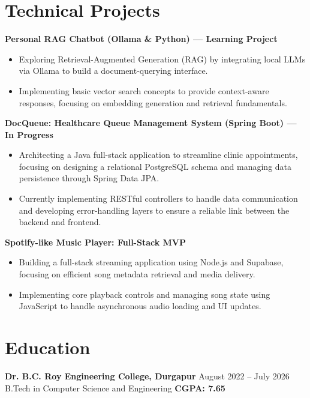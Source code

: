 \documentclass[a4paper,10.9pt]{article}
\begin{document}
\section{Technical Projects}
\textbf{Personal RAG Chatbot (Ollama \& Python) --- Learning Project}
\begin{itemize}[leftmargin=1.5em, itemsep=2pt, parsep=0pt, topsep=2pt]
    \item Exploring Retrieval-Augmented Generation (RAG) by integrating local LLMs via Ollama to build a document-querying interface.
    \item Implementing basic vector search concepts to provide context-aware responses, focusing on embedding generation and retrieval fundamentals.
\end{itemize}

\textbf{DocQueue: Healthcare Queue Management System (Spring Boot) --- In Progress}
\begin{itemize}[leftmargin=1.5em, itemsep=2pt, parsep=0pt, topsep=2pt]
    \item Architecting a Java full-stack application to streamline clinic appointments, focusing on designing a relational PostgreSQL schema and managing data persistence through Spring Data JPA.
    \item Currently implementing RESTful controllers to handle data communication and developing error-handling layers to ensure a reliable link between the backend and frontend.
\end{itemize}

\textbf{Spotify-like Music Player: Full-Stack MVP}
\begin{itemize}[leftmargin=1.5em, itemsep=2pt, parsep=0pt, topsep=2pt]
    \item Building a full-stack streaming application using Node.js and Supabase, focusing on efficient song metadata retrieval and media delivery.
    \item Implementing core playback controls and managing song state using JavaScript to handle asynchronous audio loading and UI updates.
\end{itemize}

\section{Education}
\textbf{Dr. B.C. Roy Engineering College, Durgapur} \hfill August 2022 – July 2026 \\
B.Tech in Computer Science and Engineering \hfill \textbf{CGPA: 7.65}
\end{document}

